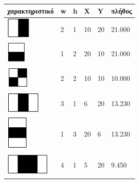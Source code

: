 \begin{table}[htbp]
  \centering
    \begin{tabular}{ | l | l | l | l | l | l | }
    \hline
        χαρακτηριστικό  & w & h  & X  & Y & πλήθος \\ \hline
    \hline
        \hspace{27pt}\includegraphics[width=0.4\maxwidth]{../figures/h1.png}
        & 2 & 1 & 10 & 20 & 21.000 \\
    \hline
        \hspace{27pt}\includegraphics[width=0.4\maxwidth]{../figures/h2.png}
        & 1 & 2 & 20 & 10 & 21.000 \\
    \hline
        \hspace{27pt}\includegraphics[width=0.4\maxwidth]{../figures/h3.png}
        & 2 & 2 & 10 & 10  & 10.000\\
    \hline
        \hspace{23pt}\includegraphics[width=0.4\maxwidth]{../figures/h4.png}
        & 3 & 1 & 6 & 20 & 13.230 \\
    \hline
        \hspace{26pt}\includegraphics[width=0.4\maxwidth]{../figures/h5.png}
        & 1 & 3 & 20 & 6 & 13.230 \\
    \hline
        \hspace{18pt}\includegraphics[width=0.4\maxwidth]{../figures/h6.png}
        & 4 & 1 & 5 & 20 & 9.450\\

\end{tabular}
\end{table}
